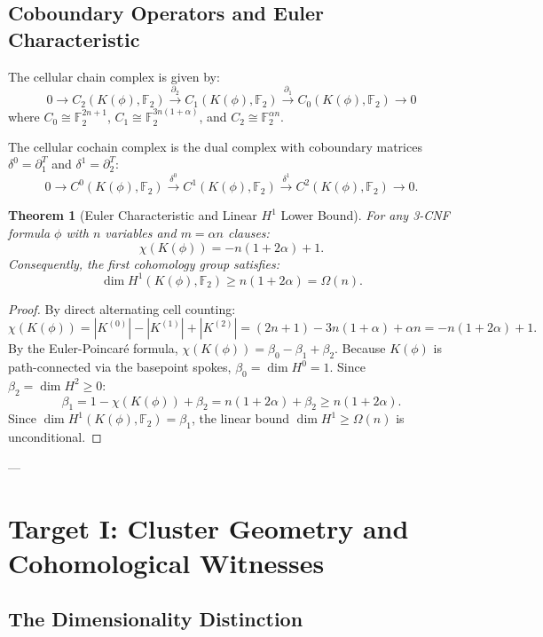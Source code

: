 \documentclass[11pt,a4paper]{article}
\theoremstyle{plain}
\newtheorem{theorem}{Theorem}[section]
\theoremstyle{definition}
\theoremstyle{remark}
\begin{document}
\subsection{Coboundary Operators and Euler Characteristic}

The cellular chain complex is given by:
\[
0 \longrightarrow C_2(K(\phi), \mathbb{F}_2) \xrightarrow{\partial_2} C_1(K(\phi), \mathbb{F}_2) \xrightarrow{\partial_1} C_0(K(\phi), \mathbb{F}_2) \longrightarrow 0
\]
where $C_0 \cong \mathbb{F}_2^{2n+1}$, $C_1 \cong \mathbb{F}_2^{3n(1+\alpha)}$, and $C_2 \cong \mathbb{F}_2^{\alpha n}$.

The cellular cochain complex is the dual complex with coboundary matrices $\delta^0 = \partial_1^T$ and $\delta^1 = \partial_2^T$:
\[
0 \longrightarrow C^0(K(\phi), \mathbb{F}_2) \xrightarrow{\delta^0} C^1(K(\phi), \mathbb{F}_2) \xrightarrow{\delta^1} C^2(K(\phi), \mathbb{F}_2) \longrightarrow 0.
\]

\begin{theorem}[Euler Characteristic and Linear $H^1$ Lower Bound]\label{thm:euler_bound}
For any 3-CNF formula $\phi$ with $n$ variables and $m = \alpha n$ clauses:
\[
\chi(K(\phi)) = -n(1 + 2\alpha) + 1.
\]
Consequently, the first cohomology group satisfies:
\[
\dim H^1(K(\phi), \mathbb{F}_2) \ge n(1 + 2\alpha) = \Omega(n).
\]
\end{theorem}

\begin{proof}
By direct alternating cell counting:
\[
\chi(K(\phi)) = |K^{(0)}| - |K^{(1)}| + |K^{(2)}| = (2n + 1) - 3n(1+\alpha) + \alpha n = -n(1 + 2\alpha) + 1.
\]
By the Euler-Poincar\'e formula, $\chi(K(\phi)) = \beta_0 - \beta_1 + \beta_2$. Because $K(\phi)$ is path-connected via the basepoint spokes, $\beta_0 = \dim H^0 = 1$. Since $\beta_2 = \dim H^2 \ge 0$:
\[
\beta_1 = 1 - \chi(K(\phi)) + \beta_2 = n(1 + 2\alpha) + \beta_2 \ge n(1 + 2\alpha).
\]
Since $\dim H^1(K(\phi), \mathbb{F}_2) = \beta_1$, the linear bound $\dim H^1 \ge \Omega(n)$ is unconditional.
\end{proof}

---

\section{Target I: Cluster Geometry and Cohomological Witnesses}

\subsection{The Dimensionality Distinction}
\end{document}
